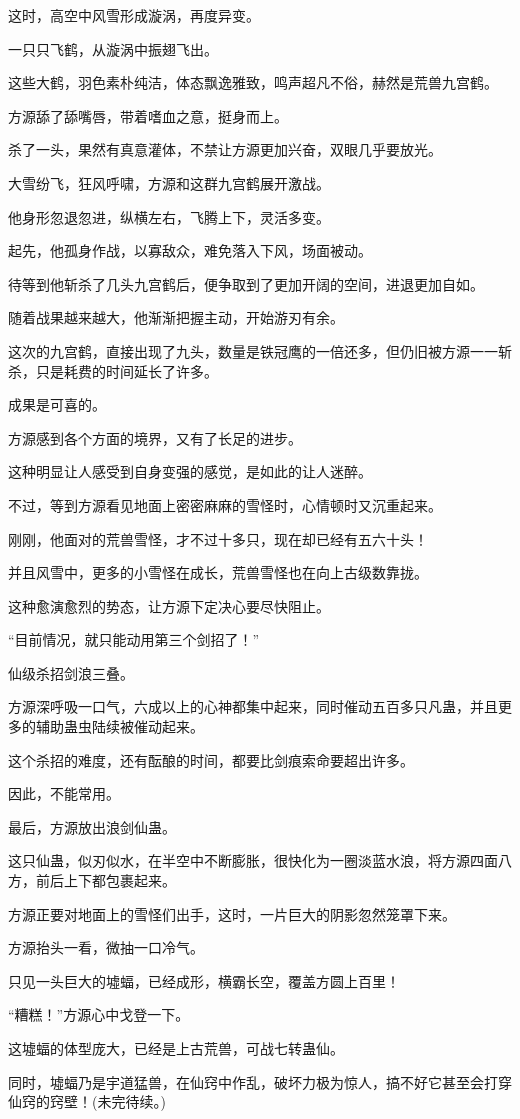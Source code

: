 \begin{this_body}
这时，高空中风雪形成漩涡，再度异变。

一只只飞鹤，从漩涡中振翅飞出。

这些大鹤，羽色素朴纯洁，体态飘逸雅致，鸣声超凡不俗，赫然是荒兽九宫鹤。

方源舔了舔嘴唇，带着嗜血之意，挺身而上。

杀了一头，果然有真意灌体，不禁让方源更加兴奋，双眼几乎要放光。

大雪纷飞，狂风呼啸，方源和这群九宫鹤展开激战。

他身形忽退忽进，纵横左右，飞腾上下，灵活多变。

起先，他孤身作战，以寡敌众，难免落入下风，场面被动。

待等到他斩杀了几头九宫鹤后，便争取到了更加开阔的空间，进退更加自如。

随着战果越来越大，他渐渐把握主动，开始游刃有余。

这次的九宫鹤，直接出现了九头，数量是铁冠鹰的一倍还多，但仍旧被方源一一斩杀，只是耗费的时间延长了许多。

成果是可喜的。

方源感到各个方面的境界，又有了长足的进步。

这种明显让人感受到自身变强的感觉，是如此的让人迷醉。

不过，等到方源看见地面上密密麻麻的雪怪时，心情顿时又沉重起来。

刚刚，他面对的荒兽雪怪，才不过十多只，现在却已经有五六十头！

并且风雪中，更多的小雪怪在成长，荒兽雪怪也在向上古级数靠拢。

这种愈演愈烈的势态，让方源下定决心要尽快阻止。

“目前情况，就只能动用第三个剑招了！”

仙级杀招剑浪三叠。

方源深呼吸一口气，六成以上的心神都集中起来，同时催动五百多只凡蛊，并且更多的辅助蛊虫陆续被催动起来。

这个杀招的难度，还有酝酿的时间，都要比剑痕索命要超出许多。

因此，不能常用。

最后，方源放出浪剑仙蛊。

这只仙蛊，似刃似水，在半空中不断膨胀，很快化为一圈淡蓝水浪，将方源四面八方，前后上下都包裹起来。

方源正要对地面上的雪怪们出手，这时，一片巨大的阴影忽然笼罩下来。

方源抬头一看，微抽一口冷气。

只见一头巨大的墟蝠，已经成形，横霸长空，覆盖方圆上百里！

“糟糕！”方源心中戈登一下。

这墟蝠的体型庞大，已经是上古荒兽，可战七转蛊仙。

同时，墟蝠乃是宇道猛兽，在仙窍中作乱，破坏力极为惊人，搞不好它甚至会打穿仙窍的窍壁！(未完待续。)

\end{this_body}

